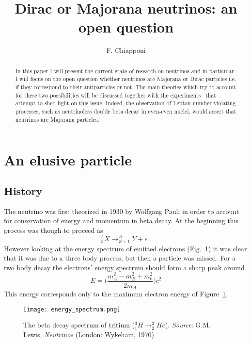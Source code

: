 \documentclass{subnucbo}
\begin{document}
\title{Dirac or Majorana neutrinos: an open question}

\author{F. Chiapponi} 



\maketitle

\begin{abstract}
In this paper I will present the current state of research on neutrinos and in particular I will focus on the open question whether neutrinos are Majorana or Dirac particles i.e. if they correspond to their antiparticles or not. The main theories which try to account for these two possibilities will be discussed together with the experiments~\cite{ref:front,ref:cupid} that attempt to shed light on this issue. Indeed, the observation of Lepton number violating processes, such as neutrinoless double beta decay in even-even nuclei, would assert that neutrinos are Majorana particles. 
\end{abstract}

\section{An elusive particle}
\subsection{History}
The neutrino was first theorized in 1930 by Wolfgang Pauli in order to account for conservation of energy and momentum in beta decay.
At the beginning this process was though to proceed as
\[
^A_Z X\rightarrow ^A_{Z+1}Y+e^-
\]
However looking at the energy spectrum of emitted electrons (Fig.~\ref{fig:betaD}) it was clear that it was due to a three body process, but then a particle was missed. For a two body decay the electrons' energy spectrum should form a sharp peak around 
\begin{equation}
E=\biggl(\frac{m^2_A-m^2_B+m^2_e}{2m_A}\biggr)c^2
\label{eq:Emax}
\end{equation}
This energy corresponds only to the maximum electron energy of Figure~\ref{fig:betaD}.

\begin{figure}[h]
\centering
\texttt{[image: energy\_spectrum.png]}
\caption{The beta decay spectrum of tritium ($^3_1H\rightarrow ^3_2He$). \emph{Source}: G.M. Lewis, \emph{Neutrinos} (London: Wykeham, 1970)}
\label{fig:betaD}
\end{figure}
\end{document}
